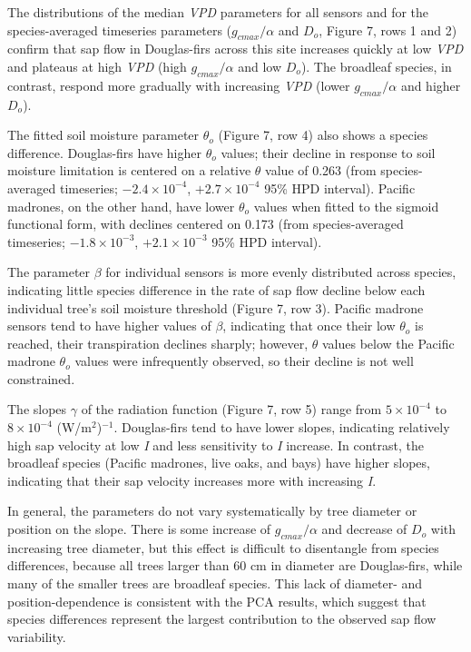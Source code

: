 The distributions of the median \textit{VPD} parameters for all sensors and for the species-averaged timeseries parameters ($g_{cmax}/\alpha$ and $D_o$, Figure 7, rows 1 and 2) confirm that sap flow in Douglas-firs across this site increases quickly at low \textit{VPD} and plateaus at high \textit{VPD} (high $g_{cmax}/\alpha$ and low $D_o$).  The broadleaf species, in contrast, respond more gradually with increasing \textit{VPD} (lower $g_{cmax}/\alpha$ and higher $D_o$).

The fitted soil moisture parameter $\theta_o$ (Figure 7, row 4) also shows a species difference.  Douglas-firs have higher $\theta_o$ values; their decline in response to soil moisture limitation is centered on a relative $\theta$ value of 0.263 (from species-averaged timeseries;  $-2.4 \times 10^{-4}$, $+2.7 \times 10^{-4}$ 95\% HPD interval).  Pacific madrones, on the other hand, have lower $\theta_o$ values when fitted to the sigmoid functional form, with declines centered on 0.173 (from species-averaged timeseries; $-1.8 \times 10^{-3}$, $+2.1 \times 10^{-3}$ 95\% HPD interval).

The parameter $\beta$ for individual sensors is more evenly distributed across species, indicating little species difference in the rate of sap flow decline below each individual tree's soil moisture threshold (Figure 7, row 3).  Pacific madrone sensors tend to have higher values of $\beta$, indicating that once their low $\theta_o$ is reached, their transpiration declines sharply; however, $\theta$ values below the Pacific madrone $\theta_o$ values were infrequently observed, so their decline is not well constrained.

The slopes $\gamma$ of the radiation function (Figure 7, row 5) range from $5 \times 10^{-4}$ to $8 \times 10^{-4}$ (W/m$^2$)$^{-1}$.  Douglas-firs tend to have lower slopes, indicating relatively high sap velocity at low \textit{I} and less sensitivity to \textit{I} increase.  In contrast, the broadleaf species (Pacific madrones, live oaks, and bays) have higher slopes, indicating that their sap velocity increases more with increasing \textit{I}.

In general, the parameters do not vary systematically by tree diameter or position on the slope.  There is some increase of $g_{cmax}/\alpha$ and decrease of $D_o$ with increasing tree diameter, but this effect is difficult to disentangle from species differences, because all trees larger than 60 cm in diameter are Douglas-firs, while many of the smaller trees are broadleaf species.  This lack of diameter- and position-dependence is consistent with the PCA results, which suggest that species differences represent the largest contribution to the observed sap flow variability.

